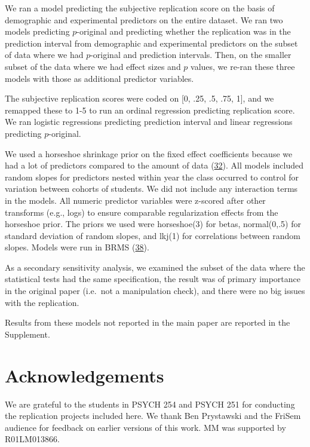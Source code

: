 \documentclass[
  english,
  a4paper,
]{article}
\begin{document}
We ran a model predicting the subjective replication score on the basis of demographic and experimental predictors on the entire dataset. We ran two models predicting \(p\)-original and predicting whether the replication was in the prediction interval from demographic and experimental predictors on the subset of data where we had \(p\)-original and prediction intervals. Then, on the smaller subset of the data where we had effect sizes and \(p\) values, we re-ran these three models with those as additional predictor variables.

The subjective replication scores were coded on {[}0, .25, .5, .75, 1{]}, and we remapped these to 1-5 to run an ordinal regression predicting replication score. We ran logistic regressions predicting prediction interval and linear regressions predicting \(p\)-original.

We used a horseshoe shrinkage prior on the fixed effect coefficients because we had a lot of predictors compared to the amount of data (\protect\hyperlink{ref-carvalho09}{32}). All models included random slopes for predictors nested within year the class occurred to control for variation between cohorts of students. We did not include any interaction terms in the models. All numeric predictor variables were z-scored after other transforms (e.g., logs) to ensure comparable regularization effects from the horseshoe prior. The priors we used were horseshoe(3) for betas, normal(0,.5) for standard deviation of random slopes, and lkj(1) for correlations between random slopes. Models were run in BRMS (\protect\hyperlink{ref-brms}{38}).

As a secondary sensitivity analysis, we examined the subset of the data where the statistical tests had the same specification, the result was of primary importance in the original paper (i.e.~not a manipulation check), and there were no big issues with the replication.

Results from these models not reported in the main paper are reported in the Supplement.

\hypertarget{acknowledgements}{%
\section*{Acknowledgements}\label{acknowledgements}}

We are grateful to the students in PSYCH 254 and PSYCH 251 for conducting the replication projects included here. We thank Ben Prystawski and the FriSem audience for feedback on earlier versions of this work. MM was supported by R01LM013866.
\end{document}
